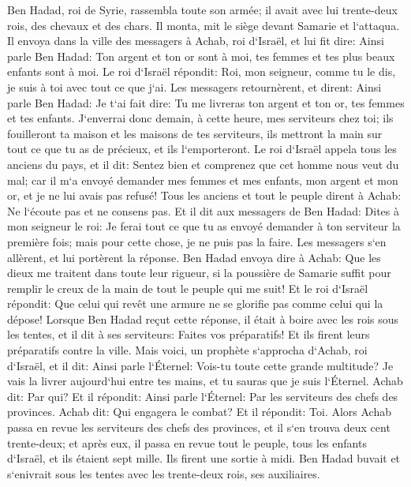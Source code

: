 \verse Ben Hadad, roi de Syrie, rassembla toute son armée; il avait avec lui trente-deux rois, des chevaux et des chars. Il monta, mit le siège devant Samarie et l`attaqua. 
\verse Il envoya dans la ville des messagers à Achab, roi d`Israël, 
\verse et lui fit dire: Ainsi parle Ben Hadad: Ton argent et ton or sont à moi, tes femmes et tes plus beaux enfants sont à moi. 
\verse Le roi d`Israël répondit: Roi, mon seigneur, comme tu le dis, je suis à toi avec tout ce que j`ai. 
\verse Les messagers retournèrent, et dirent: Ainsi parle Ben Hadad: Je t`ai fait dire: Tu me livreras ton argent et ton or, tes femmes et tes enfants. 
\verse J`enverrai donc demain, à cette heure, mes serviteurs chez toi; ils fouilleront ta maison et les maisons de tes serviteurs, ils mettront la main sur tout ce que tu as de précieux, et ils l`emporteront. 
\verse Le roi d`Israël appela tous les anciens du pays, et il dit: Sentez bien et comprenez que cet homme nous veut du mal; car il m`a envoyé demander mes femmes et mes enfants, mon argent et mon or, et je ne lui avais pas refusé! 
\verse Tous les anciens et tout le peuple dirent à Achab: Ne l`écoute pas et ne consens pas. 
\verse Et il dit aux messagers de Ben Hadad: Dites à mon seigneur le roi: Je ferai tout ce que tu as envoyé demander à ton serviteur la première fois; mais pour cette chose, je ne puis pas la faire. Les messagers s`en allèrent, et lui portèrent la réponse. 
\verse Ben Hadad envoya dire à Achab: Que les dieux me traitent dans toute leur rigueur, si la poussière de Samarie suffit pour remplir le creux de la main de tout le peuple qui me suit! 
\verse Et le roi d`Israël répondit: Que celui qui revêt une armure ne se glorifie pas comme celui qui la dépose! 
\verse Lorsque Ben Hadad reçut cette réponse, il était à boire avec les rois sous les tentes, et il dit à ses serviteurs: Faites vos préparatifs! Et ils firent leurs préparatifs contre la ville. 
\verse Mais voici, un prophète s`approcha d`Achab, roi d`Israël, et il dit: Ainsi parle l`Éternel: Vois-tu toute cette grande multitude? Je vais la livrer aujourd`hui entre tes mains, et tu sauras que je suis l`Éternel. 
\verse Achab dit: Par qui? Et il répondit: Ainsi parle l`Éternel: Par les serviteurs des chefs des provinces. Achab dit: Qui engagera le combat? Et il répondit: Toi. 
\verse Alors Achab passa en revue les serviteurs des chefs des provinces, et il s`en trouva deux cent trente-deux; et après eux, il passa en revue tout le peuple, tous les enfants d`Israël, et ils étaient sept mille. 
\verse Ils firent une sortie à midi. Ben Hadad buvait et s`enivrait sous les tentes avec les trente-deux rois, ses auxiliaires. 

